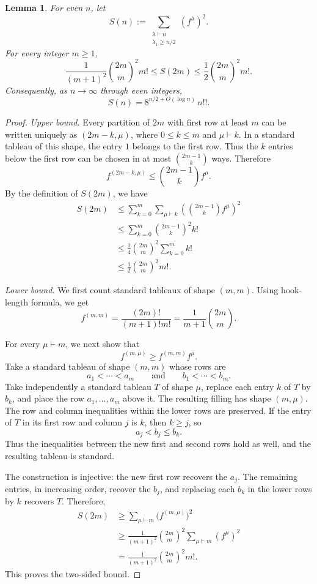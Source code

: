 \documentclass[12pt]{article}
\newtheorem{lemma}{Lemma}[section]
\theoremstyle{definition}
\newcommand{\1}{\mathbf 1}
\begin{document}
\begin{lemma}\label{lem:CDF-sum-asymptotic}
For even $n$, let
$$
S(n):=\sum_{\substack{\lambda\vdash n\\\lambda_1\geq n/2}}
(f^\lambda)^2.
$$
For every integer $m\geq 1$,
$$
\frac{1}{(m+1)^2}\binom{2m}{m}^{2}m!
\leq S(2m)
\leq \frac{1}{2}\binom{2m}{m}^{2}m!.
$$
Consequently, as $n\to\infty$ through even integers,
$$
S(n)=8^{n/2+O(\log n)}\,n!!.
$$
\end{lemma}

\begin{proof}
\emph{Upper bound.}
Every partition of $2m$ with first row at least $m$ can be written
uniquely as $(2m-k,\mu)$, where $0\leq k\leq m$ and $\mu\vdash k$.
In a standard tableau of this shape, the entry $1$ belongs to the first
row. Thus the $k$ entries below the first row can be chosen in at most
$\binom{2m-1}{k}$ ways. Therefore
$$
f^{(2m-k,\mu)}\leq \binom{2m-1}{k}f^\mu.
$$
By the definition of $S(2m)$, we have
\begin{align*}
    S(2m)&\leq \sum_{k=0}^{m}\sum_{\mu\vdash k}\left(\binom{2m-1}{k}f^{\mu}\right)^2\\
    &\leq \sum_{k=0}^{m}\binom{2m-1}{k}^{2}k!\\
    &\leq \frac{1}{4}\binom{2m}{m}^{2}\sum_{k=0}^{m}k!\\
    &\leq  \frac{1}{2}\binom{2m}{m}^{2}m!.
\end{align*}

\medskip
\noindent\emph{Lower bound.}
We first count standard tableaux of shape $(m,m)$. Using hook-length formula, we get 
$$
f^{(m,m)}
=\frac{(2m)!}{(m+1)!m!}
=\frac{1}{m+1}\binom{2m}{m}.
$$

For every $\mu\vdash m$, we next show that
$$
f^{(m,\mu)}\geq f^{(m,m)}f^\mu.
$$
Take a standard tableau of shape $(m,m)$ whose rows are
$$
a_1<\cdots<a_m
\qquad\text{and}\qquad
b_1<\cdots<b_m.
$$
Take independently a standard tableau $T$ of shape $\mu$, replace each
entry $k$ of $T$ by $b_k$, and place the row $a_1,\ldots,a_m$ above it.
The resulting filling has shape $(m,\mu)$. The row and column
inequalities within the lower rows are preserved. If the entry of $T$
in its first row and column $j$ is $k$, then $k\geq j$, so
$$
a_j<b_j\leq b_k.
$$
Thus the inequalities between the new first and second rows hold as
well, and the resulting tableau is standard.

The construction is injective: the new first row recovers the $a_j$.
The remaining entries, in increasing order, recover the $b_j$, and
replacing each $b_k$ in the lower rows by $k$ recovers $T$.
Therefore, 
$$
\begin{aligned}
S(2m)
&\geq\sum_{\mu\vdash m}\bigl(f^{(m,\mu)}\bigr)^2\\
&\geq\frac{1}{(m+1)^2}\binom{2m}{m}^{2}
\sum_{\mu\vdash m}(f^\mu)^2\\
&=\frac{1}{(m+1)^2}\binom{2m}{m}^{2}m!.
\end{aligned}
$$
This proves the two-sided bound.


\end{proof}
\end{document}
